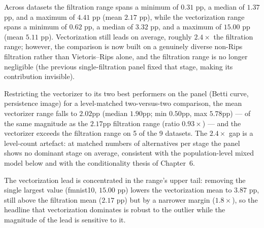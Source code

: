 \documentclass[12pt, a4paper]{report}
\theoremstyle{definition}
\theoremstyle{plain}
\theoremstyle{remark}
\begin{document}
Across datasets the filtration range spans a minimum of
$0.31$ pp, a median of $1.37$ pp, and a maximum of $4.41$ pp (mean
$2.17$ pp), while the vectorization range spans a minimum of $0.62$ pp,
a median of $3.32$ pp, and a maximum of $15.00$ pp (mean $5.11$ pp).
Vectorization still leads on average, roughly $2.4\times$
the filtration range; however, the comparison is now built on a genuinely
diverse non-Rips filtration rather than Vietoris--Rips alone, and the
filtration range is no longer negligible (the previous single-filtration
panel fixed that stage, making its contribution invisible).

Restricting the vectorizer to its two best performers on the panel
(Betti curve, persistence image) for a level-matched two-versus-two
comparison, the mean vectorizer range falls to $2.02$pp (median
$1.90$pp; min $0.50$pp, max $5.78$pp) --- of the same magnitude as
the $2.17$pp filtration range (ratio $0.93\times$) --- and the
vectorizer exceeds the filtration range on 5 of the 9 datasets. The
$2.4\times$ gap is a level-count artefact: at
matched numbers of alternatives per stage the panel shows no dominant
stage on average, consistent with the population-level mixed model
below and with the conditionality thesis of Chapter~6.

The vectorization lead is concentrated in the range's upper tail: removing
the single largest value (fmnist10, $15.00$ pp) lowers the vectorization
mean to $3.87$ pp, still above the filtration mean ($2.17$ pp) but by a
narrower margin ($1.8\times$), so the headline that vectorization
dominates is robust to the outlier while the magnitude of the lead is
sensitive to it.
\end{document}
